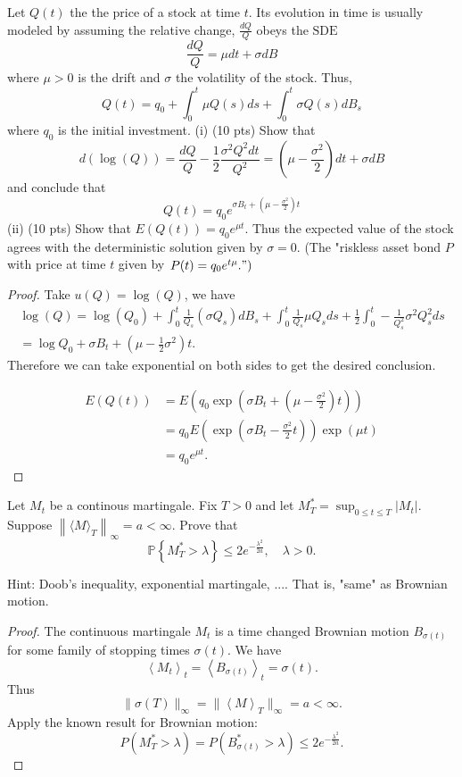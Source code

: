 \begin{problem}
	Let $Q(t)$ the the price of a stock at time $t$. Its evolution in time is usually modeled by assuming the relative change, $\frac{d Q}{Q}$ obeys the $\mathrm{SDE}$
\[
\frac{d Q}{Q}=\mu d t+\sigma d B
\]
where $\mu>0$ is the drift and $\sigma$ the volatility of the stock. Thus,
\[
Q(t)=q_0+\int_0^t \mu Q(s) d s+\int_0^t \sigma Q(s) d B_s
\]
where $q_0$ is the initial investment.
(i) (10 pts) Show that
\[
d(\log (Q))=\frac{d Q}{Q}-\frac{1}{2} \frac{\sigma^2 Q^2 d t}{Q^2}=\left(\mu-\frac{\sigma^2}{2}\right) d t+\sigma d B
\]
and conclude that
\[
Q(t)=q_0 e^{\sigma B_t+\left(\mu-\frac{\sigma^2}{2}\right) t}
\]
(ii) (10 pts) Show that $E(Q(t))=q_0 e^{\mu t}$. Thus the expected value of the stock agrees with the deterministic solution given by $\sigma=0$. (The "riskless asset bond $P$ with price at time $t$ given by $\left.P(t)=q_0 e^{t \mu} . "\right)$
\end{problem}
\begin{proof}
	Take $u(Q) = \log(Q)$, we have
	\begin{multline}
		\log(Q) = \log(Q_0) + \int _0^t \frac{1}{Q_s} (\sigma Q_s) d B_s
		+ \int _0^t \frac{1}{Q_s} \mu Q_s d s + \frac{1}{2} \int _0^t -\frac{1}{Q_s^2} \sigma^2 Q_s^2 d s
		\\= \log Q_0 + \sigma B_t + (\mu - \frac{1}{2} \sigma^2) t
	.\end{multline} 
	Therefore we can take exponential on both sides to get the desired conclusion.

	\begin{align*}
		E(Q(t))
		&= E\left( q_0 \exp\left( \sigma B_t + \left( \mu - \frac{\sigma^2}{2} \right) t \right)  \right)  \\
		&= q_0 E\left( \exp\left( \sigma B_t - \frac{\sigma^2}{2}t \right)  \right) \exp(\mu t) \\
		&= q_0 e^{\mu t} 
	.\end{align*}
\end{proof}
\begin{problem}
	Let $M_t$ be a continous martingale. Fix $T>0$ and let $M_T^*=\sup _{0 \leq t \leq T}\left|M_t\right|$. Suppose $\left\|\langle M\rangle_T\right\|_{\infty}=a<\infty$. Prove that
\[
\mathbb{P}\left\{M_T^*>\lambda\right\} \leq 2 e^{-\frac{\lambda^2}{2 a}}, \quad \lambda>0 .
\]

Hint: Doob's inequality, exponential martingale, .... That is, "same" as Brownian motion.
\end{problem}
\begin{proof}
	The continuous martingale $M_t$ is a time changed Brownian motion $B_{\sigma(t)}$ for some family of stopping times $\sigma(t)$. We have
	\[
		\left\langle M_t \right\rangle_t = \left\langle B_{\sigma(t)} \right\rangle _t = \sigma(t)
	.\] 
	Thus
	\[
		\|\sigma(T)\|_\infty  = \|\left\langle M \right\rangle _T\|_\infty = a < \infty 
	.\] 
	Apply the known result for Brownian motion:
	\[
		P(M_T^* > \lambda) = P\left( B_{\sigma(t)}^* > \lambda \right) 
		\le 2 e^{- \frac{\lambda^2}{2 a}}
	.\] 
\end{proof}

